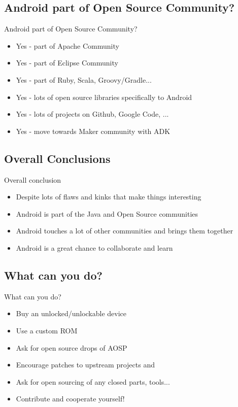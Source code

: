 \documentclass[aspectratio=169]{beamer}
\begin{document}
  \subsection{Android part of Open Source Community?}
    \begin{frame}{Android part of Open Source Community?}
     \begin{itemize}
      \item<1-> Yes - part of Apache Community
      \item<2-> Yes - part of Eclipse Community
      \item<3-> Yes - part of Ruby, Scala, Groovy/Gradle...
      \item<4-> Yes - lots of open source libraries specifically to Android
      \item<5-> Yes - lots of projects on Github, Google Code, ...
      \item<6-> Yes - move towards Maker community with ADK
     \end{itemize}
    \end{frame}

  \subsection{Overall Conclusions}
    \begin{frame}{Overall conclusion}
      \begin{itemize}
        \item<1-> Despite lots of flaws and kinks that make things interesting
        \item<2-> Android is part of the Java and Open Source communities
        \item<3-> Android touches a lot of other communities and brings them together
        \item<4-> Android is a great chance to collaborate and learn
      \end{itemize}
    \end{frame}

  \subsection{What can you do?}
    \begin{frame}{What can you do?}
      \begin{itemize}
        \item<1-> Buy an unlocked/unlockable device
        \item<2-> Use a custom ROM
        \item<3-> Ask for open source drops of AOSP 
        \item<4-> Encourage patches to upstream projects and 
        \item<5-> Ask for open sourcing of any closed parts, tools...
        \item<6-> Contribute and cooperate yourself! 
      \end{itemize}
    \end{frame}
\end{document}
